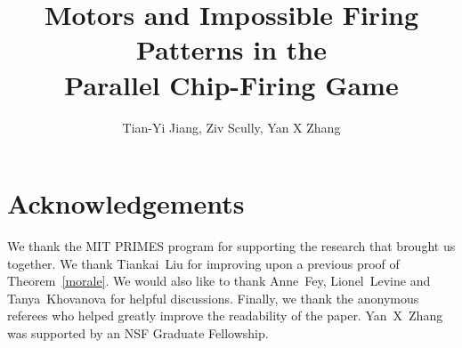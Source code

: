 \documentclass[10pt]{siamltex}
\newlength{\figWidthA}
\newlength{\figWidthB}
\numberwithin{equation}{section}
\begin{document}
\setlength{}
\setlength{}

\title{Motors and Impossible
  Firing Patterns in the\\Parallel Chip-Firing Game}
\author{Tian-Yi Jiang, Ziv Scully, Yan X Zhang}
\begin{abstract}

\end{abstract}
\maketitle

















\section*{Acknowledgements}
We thank the MIT PRIMES program for supporting the research that brought us
together. We thank Tiankai~Liu for improving upon a previous proof of
Theorem~\ref{morale}. We would also like to thank \mbox{Anne Fey}, \mbox{Lionel
  Levine} and \mbox{Tanya Khovanova} for helpful discussions. Finally, we thank
the anonymous referees who helped greatly improve the readability of the
paper. \mbox{Yan X Zhang} was supported by an NSF Graduate Fellowship.



\end{document}
